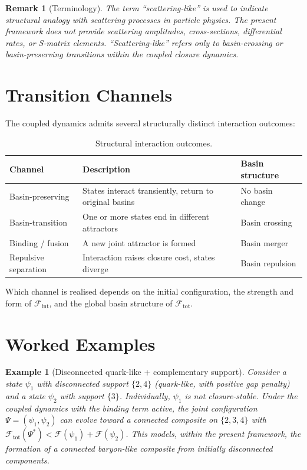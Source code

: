 \documentclass[12pt]{article}
\newtheorem{remark}[theorem]{Remark}
\newtheorem{example}[theorem]{Example}
\newcommand{\Fcal}{\mathcal{F}}
\newcommand{\Fint}{\Fcal_{\mathrm{int}}}
\newcommand{\Ftot}{\Fcal_{\mathrm{tot}}}
\begin{document}
\begin{remark}[Terminology]
The term ``scattering-like'' is used to indicate structural analogy with scattering processes in particle physics. The present framework does not provide scattering amplitudes, cross-sections, differential rates, or S-matrix elements. ``Scattering-like'' refers only to basin-crossing or basin-preserving transitions within the coupled closure dynamics.
\end{remark}

\section{Transition Channels}\label{sec:channels}

The coupled dynamics admits several structurally distinct interaction outcomes:

\begin{table}[ht]
\centering
\caption{Structural interaction outcomes.}
\label{tab:channels}
\begin{tabular}{@{}lll@{}}
\toprule
Channel & Description & Basin structure \\
\midrule
Basin-preserving & States interact transiently, return to original basins & No basin change \\
Basin-transition & One or more states end in different attractors & Basin crossing \\
Binding / fusion & A new joint attractor is formed & Basin merger \\
Repulsive separation & Interaction raises closure cost, states diverge & Basin repulsion \\
\bottomrule
\end{tabular}
\end{table}

Which channel is realised depends on the initial configuration, the strength and form of $\Fint$, and the global basin structure of $\Ftot$.

\section{Worked Examples}\label{sec:examples}

\begin{example}[Disconnected quark-like + complementary support]\label{ex:binding}
Consider a state $\psi_1$ with disconnected support $\{2,4\}$ (quark-like, with positive gap penalty) and a state $\psi_2$ with support $\{3\}$. Individually, $\psi_1$ is not closure-stable. Under the coupled dynamics with the binding term active, the joint configuration $\Psi = (\psi_1, \psi_2)$ can evolve toward a connected composite on $\{2,3,4\}$ with $\Ftot(\Psi^*) < \Fcal(\psi_1) + \Fcal(\psi_2)$. This models, within the present framework, the formation of a connected baryon-like composite from initially disconnected components.
\end{example}
\end{document}
